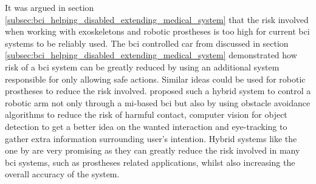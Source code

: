 


It was argued in section \ref{subsec:bci_helping_disabled_extending_medical_system} that the risk involved when working with exoskeletons and robotic prostheses is too high for current \gls{bci} systems to be reliably used.
The \gls{bci} controlled car from \citet{bci_mi_four_wheel_drive} discussed in section \ref{subsec:bci_helping_disabled_extending_medical_system} demonstrated how risk of a \gls{bci} system can be greatly reduced by using an additional system responsible for only allowing safe actions.
Similar ideas could be used for robotic prostheses to reduce the risk involved.
 proposed such a hybrid system to control a robotic arm not only through a \gls{mi}-based \gls{bci} but also by using obstacle avoidance algorithms to reduce the risk of harmful contact, computer vision for object detection to get a better idea on the wanted interaction and eye-tracking to gather extra information surrounding user's intention.
Hybrid systems like the one by \citet{bci_mi_robotic_arm_collision_avoidance} are very promising as they can greatly reduce the risk involved in many \gls{bci} systems, such as prostheses related applications, whilst also increasing the overall accuracy of the system.


